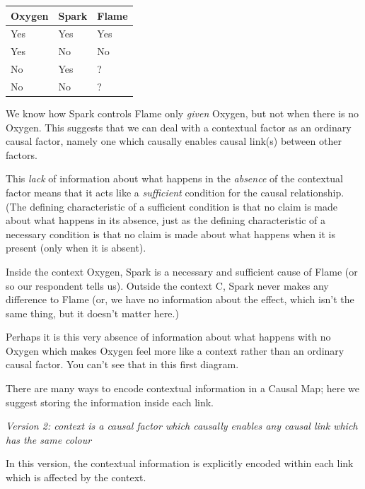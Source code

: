 \documentclass[
]{book}
\begin{document}
\begin{longtable}[]{@{}lll@{}}
\toprule()
Oxygen & Spark & Flame \\
\midrule()
\endhead
Yes & Yes & Yes \\
Yes & No & No \\
No & Yes & ? \\
No & No & ? \\
\bottomrule()
\end{longtable}

We know how Spark controls Flame only \emph{given} Oxygen, but not when there is no Oxygen. This suggests that we can deal with a contextual factor as an ordinary causal factor, namely one which causally enables causal link(s) between other factors.

This \emph{lack} of information about what happens in the \emph{absence} of the contextual factor means that it acts like a \emph{sufficient} condition for the causal relationship. (The defining characteristic of a sufficient condition is that no claim is made about what happens in its absence, just as the defining characteristic of a necessary condition is that no claim is made about what happens when it is present (only when it is absent).

Inside the context Oxygen, Spark is a necessary and sufficient cause of Flame (or so our respondent tells us). Outside the context C, Spark never makes any difference to Flame (or, we have no information about the effect, which isn't the same thing, but it doesn't matter here.)

Perhaps it is this very absence of information about what happens with no Oxygen which makes Oxygen feel more like a context rather than an ordinary causal factor. You can't see that in this first diagram.

There are many ways to encode contextual information in a Causal Map; here we suggest storing the information inside each link.

\emph{Version 2: context is a causal factor which causally enables any causal link which has the same colour}

In this version, the contextual information is explicitly encoded within each link which is affected by the context.
\end{document}
